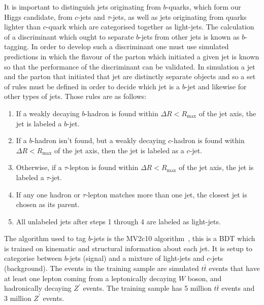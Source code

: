 It is important to distinguish jets originating from $b$-quarks, which form our
Higgs candidate, from $c$-jets and $\tau$-jets, as well as jets originating from
quarks lighter than $c$-quark which are categorised together as light-jets. The
calculation of a discriminant which ought to separate $b$-jets from other jets is
known as $b$-tagging. In order to develop such a discriminant one must use
simulated predictions in which the flavour of the parton which initiated a given
jet is known so that the performance of the discriminant can be validated. In
simulation a jet and the parton that initiated that jet are distinctly separate
objects and so a set of rules must be defined in order to decide which jet is a
$b$-jet and likewise for other types of jets. Those rules are as follows:
\begin{enumerate}
\item  If a weakly decaying $b$-hadron is found within $\Delta R<R_{\text{max}}$ of the
  jet axis, the jet is labeled a $b$-jet.
\item  If a $b$-hadron isn't found, but a weakly decaying $c$-hadron is
  found within $\Delta R<R_{\text{max}}$ of the jet axis, then the jet is labeled as a $c$-jet.
\item  Otherwise, if a $\tau$-lepton is found within
  $\Delta R<R_{\text{max}}$ of the jet axis, the jet is labeled a $\tau$-jet.
\item If any one hadron or $\tau$-lepton matches more than one jet, the closest jet
  is chosen as its parent.
\item All unlabeled jets after steps 1 through 4 are labeled as light-jets.
\end{enumerate}

The algorithm used to tag $b$-jets is the MV2c10 algorithm~\cite{mv2c10}, this
is a BDT which is trained on kinematic and structural information about each
jet. It is setup to categorise between $b$-jets (signal) and a mixture of
light-jets and $c$-jets (background). The events in the training sample are
simulated $t\bar{t}$ events that have at least one lepton coming from a
leptonically decaying $W$ boson, and hadronically decaying $Z^\prime$ events.
The training sample has 5 million $t\bar{t}$ events and 3 million $Z^\prime$
events.

